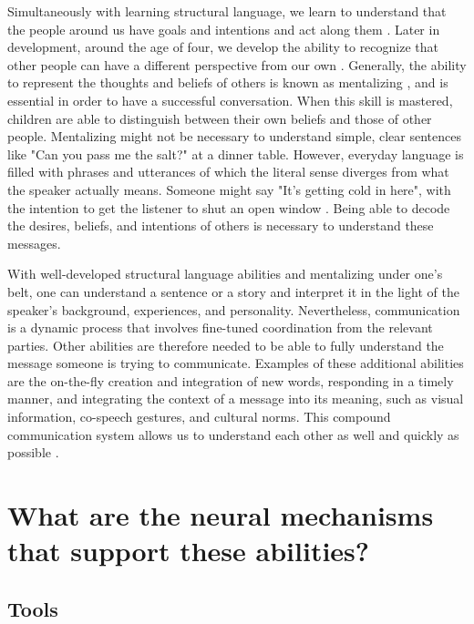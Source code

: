 Simultaneously with learning structural language, we learn to understand that the people around us have goals and intentions and act along them \citep{gergely2002,tomasello2003}. Later in development, around the age of four, we develop the ability to recognize that other people can have a different perspective from our own \citep{wimmer1983}. Generally, the ability to represent the thoughts and beliefs of others is known as mentalizing \citep{premack1978}, and is essential in order to have a successful conversation. When this skill is mastered, children are able to distinguish between their own beliefs and those of other people. Mentalizing might not be necessary to understand simple, clear sentences like "Can you pass me the salt?" at a dinner table. However, everyday language is filled with phrases and utterances of which the literal sense diverges from what the speaker actually means. Someone might say "It's getting cold in here", with the intention to get the listener to shut an open window \citep{vanackeren2012}. Being able to decode the desires, beliefs, and intentions of others is necessary to understand these messages.

With well-developed structural language abilities and mentalizing under one's belt, one can understand a sentence or a story and interpret it in the light of the speaker's background, experiences, and personality. Nevertheless, communication is a dynamic process that involves fine-tuned coordination from the relevant parties. Other abilities are therefore needed to be able to fully understand the message someone is trying to communicate. Examples of these additional abilities are the on-the-fly creation and integration of new words, responding in a timely manner, and integrating the context of a message into its meaning, such as visual information, co-speech gestures, and cultural norms. This compound communication system allows us to understand each other as well and quickly as possible \citep{levinson2020,levinson2024}.
 
\section*{What are the neural mechanisms that support these abilities?}

\subsection*{Tools}

